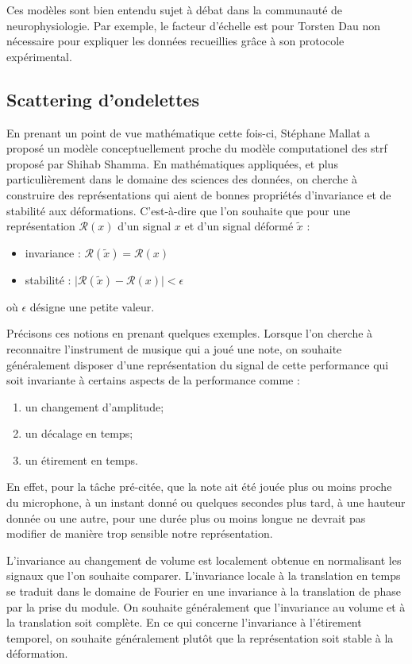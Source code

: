 Ces modèles sont bien entendu sujet à débat dans la communauté de neurophysiologie. Par exemple, le facteur d'échelle est pour Torsten Dau non nécessaire pour expliquer les données recueillies grâce à son protocole expérimental.

\subsection{\nmu Scattering d'ondelettes}  \label{sec:scattering}

En prenant un point de vue mathématique cette fois-ci, Stéphane Mallat a proposé un modèle conceptuellement proche du modèle computationel des strf proposé par Shihab Shamma. En mathématiques appliquées, et plus particulièrement dans le domaine des sciences des données, on cherche à construire des représentations qui aient de bonnes propriétés d'invariance et de stabilité aux déformations. C'est-à-dire que l'on souhaite que pour une représentation $\mathcal{R}(x)$ d'un signal $x$ et d'un signal déformé $\tilde x$ :
\begin{itemize}
  \item invariance : $\mathcal{R}(\tilde x) = \mathcal{R}(x)$
  \item stabilité : $ \vert \mathcal{R}(\tilde x) - \mathcal{R}(x) | < \epsilon $
\end{itemize}
où $\epsilon$ désigne une petite valeur.

Précisons ces notions en prenant quelques exemples. Lorsque l'on cherche à reconnaitre l'instrument de musique qui a joué une note, on souhaite généralement disposer d'une représentation du signal de cette performance qui soit invariante à certains aspects de la performance comme :
\begin{enumerate}
  \item un changement d'amplitude;
  \item un décalage en temps;
  \item un étirement en temps.
\end{enumerate}
En effet, pour la tâche pré-citée, que la note ait été jouée plus ou moins proche du microphone, à un instant donné ou quelques secondes plus tard, à une hauteur donnée ou une autre, pour une durée plus ou moins longue ne devrait pas modifier de manière trop sensible notre représentation.

L'invariance au changement de volume est localement obtenue en normalisant les signaux que l'on souhaite comparer. L'invariance locale à la translation en temps se traduit dans le domaine de Fourier en une invariance à la translation de phase par la prise du module. On souhaite généralement que l'invariance au volume et à la translation soit complète. En ce qui concerne l'invariance à l'étirement temporel, on souhaite généralement plutôt que la représentation soit stable à la déformation.

